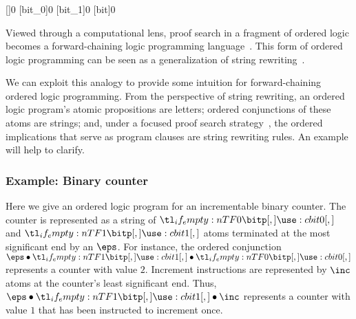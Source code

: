 \subsubsection{}\label{sec:xyz}

%
\NewPredicate{\eps}[{}]{0}%
\expandafter\NewPredicate\expandafter{\csname bit0\endcsname}[bit_0]{0}%
\expandafter\NewPredicate\expandafter{\csname bit1\endcsname}[bit_1]{0}%
\NewPredicate{\bitp}[bit]{0}%
\ExplSyntaxOn
{}
\ExplSyntaxOff
{}%
%

Viewed through a computational lens, proof search in a fragment of ordered logic becomes a forward-chaining logic programming language~\autocite{Pfenning+Simmons:LICS09}.
This form of ordered logic programming can be seen as a generalization of string rewriting~\autocite[see, \eg,][]{Book+Otto:SRS93}.

We can exploit this analogy to provide some intuition for forward-chaining ordered logic programming.
From the perspective of string rewriting, an ordered logic program's atomic propositions are letters; ordered conjunctions of these atoms are strings; and, under a focused proof search strategy~\autocite{Andreoli:JLC92}, the ordered implications that serve as program clauses are string rewriting rules.
An example will help to clarify.

\subsubsection{Example: Binary counter}\label{sec:exampl-binary-count-5}

Here we give an ordered logic program for an incrementable binary counter.
% 
The counter is represented as a string of $\bit{0}$ and $\bit{1}$ atoms terminated at the most significant end by an $\eps$.
For instance, the ordered conjunction\fxnote{\st{,}} $\eps \fuse \bit{1} \fuse \bit{0}$ represents a counter with value $2$.
%
Increment instructions are represented by $\inc$ atoms at the counter's least significant end. 
Thus, $\eps \fuse \bit{1} \fuse \inc$ represents a counter with value $1$ that has been instructed to increment once.

